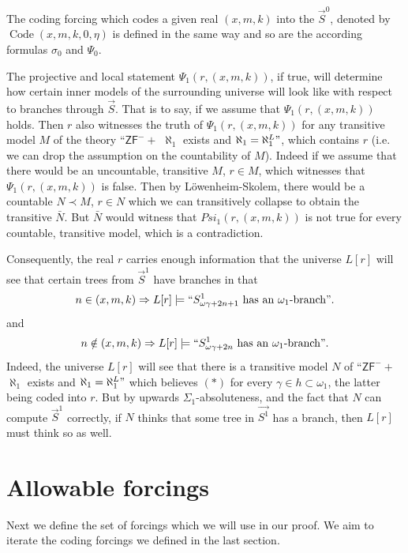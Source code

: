 \documentclass[a4paper,11pt]{article}
\newcommand{\ZFP}{\mathsf{ZF}^-}
\begin{document}
The coding forcing which codes a given real $(x,m,k)$ into the $\vec{S}^0$, denoted by $\operatorname{Code} {(x,m,k,0,\eta)}$ is defined in the same way and so are the according formulas $\sigma_0$ and $\Psi_0$.

 
 The projective and local statement $ \Psi_1 (r, (x,m,k))$, if true,  will determine how certain inner models of the surrounding universe will look like with respect to branches through $\vec{S}$.
That is to say, if we assume that $ \Psi_1 (r, (x,m,k))$ holds. Then $r$ also witnesses the truth of $ \Psi_1 (r, (x,m,k))$ for any transitive  model $M$ of  the theory ``$\ZFP+$ $\aleph_1$ exists and $\aleph_1= \aleph_1^L"$,  which contains $r$ (i.e. we can drop the assumption on the countability of $M$).
Indeed if we assume 
that there would be an uncountable, transitive $M$, $r \in M$, which witnesses that $ \Psi_1 (r, (x,m,k))$ is false. Then by L\"owenheim-Skolem, there would be a countable $N\prec M$, $r\in N$ which we can transitively collapse to obtain the transitive $\bar{N}$. But $\bar{N}$ would witness that $ Psi_1 (r, (x,m,k))$ is not true for every countable, transitive model, which is a contradiction.

Consequently, the real $r$ carries enough information that
the universe $L[r]$ will see that certain trees from $\vec{S}^1$ have branches in that
\begin{align*}
n \in (x,m,k) \Rightarrow L[r] \models  ``S^1_{\omega \gamma + 2n+1} \text{ has an $\omega_1$-branch}".
\end{align*}
and
\begin{align*}
n \notin (x,m,k) \Rightarrow L[r] \models ``S^1_{\omega \gamma + 2n} \text{ has an $\omega_1$-branch}".
\end{align*}
Indeed, the universe $L[r]$ will see that there is a transitive model $N$ of ``$\ZFP+$ $\aleph_1$ exists and $\aleph_1=\aleph_1^L"$ which believes $(\ast)$ for every $\gamma \in h \subset \omega_1$, the latter being coded into $r$. But by upwards $\Sigma_1$-absoluteness, and the fact that $N$ can compute $\vec{S}^1$ correctly, if $N$ thinks that some tree in $\vec{S^1}$ has a branch, then $L[r]$ must think so as well.

\section{Allowable forcings}

Next we define the set of forcings which we will use in our proof.
We aim to iterate the coding forcings we defined in the last section.  
\end{document}
